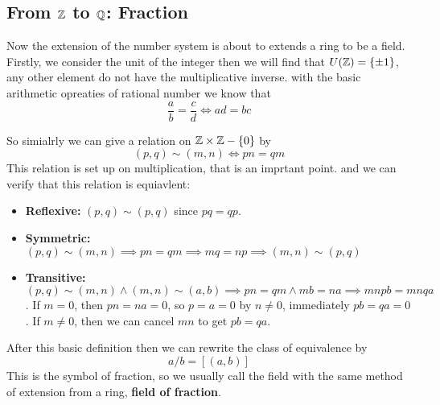 \documentclass[en,geye,blue,normal,12pt]{elegantnote}
\begin{document}
\subsection{From \texorpdfstring{$\mathbb{Z}$}{TEXT} to \texorpdfstring{$\mathbb{Q}$}{TEXT}: Fraction}
Now the extension of the number system is about to extends a ring to be a field. Firstly, we consider the unit of the integer then we will find that \(U(\mathbb{Z}) = \{\pm 1\}\), any other element do not have the multiplicative inverse. with the basic arithmetic opreaties of rational number we know that 
\[\frac{a}{b} = \frac{c}{d} \iff ad = bc\]

So simialrly we can give a relation on \(\mathbb{Z} \times \mathbb{Z}-\{0\}\) by 
\[(p,q) \sim (m,n) \iff pn = qm\]
This relation is set up on multiplication, that is an imprtant point. and we can verify that this relation is equiavlent:
\begin{itemize}
  \item\textbf{ Reflexive:} \((p,q) \sim ({p,q})\) since  \(pq =qp\).
  \item \textbf{Symmetric:} \((p,q) \sim (m,n) \implies pn = qm \implies mq =np \implies (m,n) \sim (p,q)\)
  \item \textbf{Transitive:} \((p,q) \sim (m,n) \land (m,n) \sim (a,b) \implies  pn = qm \land mb = na \implies mnpb = mnqa\). If \(m =0\), then \(pn=na=0\), so \(p=a=0\) by \(n \neq 0\), immediately \(pb=qa=0 \). If \(m \neq 0\), then we can cancel \(mn\) to get \(pb = qa\).
\end{itemize}

After this basic definition then we can rewrite the class of equivalence by 
\[a/b = [(a,b)]\]
This is the symbol of fraction, so we usually call the field with the same method of extension from a ring, \textbf{field of fraction}. 
\end{document}
